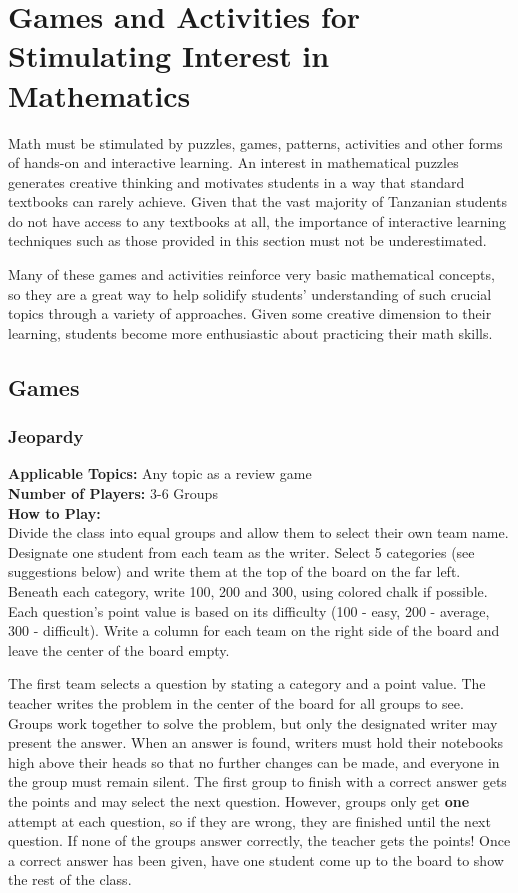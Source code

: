 \chapter{Games and Activities for Stimulating Interest in Mathematics} \label{cha:gamesandactivities}
Math must be stimulated by puzzles, games, patterns, activities and other forms of hands-on and interactive learning. An interest in mathematical puzzles generates creative thinking and motivates students in a way that standard textbooks can rarely achieve. Given that the vast majority of Tanzanian students do not have access to any textbooks at all, the importance of interactive learning techniques such as those provided in this section must not be underestimated.

Many of these games and activities reinforce very basic mathematical concepts, so they are a great way to help solidify students' understanding of such crucial topics through a variety of approaches. Given some creative dimension to their learning, students become more enthusiastic about practicing their math skills.

\section{Games} \label{games}

	\subsection{Jeopardy} \label{jeopardy}
	\textbf{Applicable Topics:} Any topic as a review game\\	
	\textbf{Number of Players:} 3-6 Groups\\
	
	\noindent \textbf{How to Play:}\\
	Divide the class into equal groups and allow them to select their own team name. Designate one student from each team as the writer. Select 5 categories (see suggestions below) and write them at the top of the board on the far left. Beneath each category, write 100, 200 and 300, using colored chalk if possible. Each question's point value is based on its difficulty (100 - easy, 200 - average, 300 - difficult). Write a column for each team on the right side of the board and leave the center of the board empty.
	
	The first team selects a question by stating a category and a point value. The teacher writes the problem in the center of the board for all groups to see. Groups work together to solve the problem, but only the designated writer may present the answer. When an answer is found, writers must hold their notebooks high above their heads so that no further changes can be made, and everyone in the group must remain silent. The first group to finish with a correct answer gets the points and may select the next question. However, groups only get \textbf{one} attempt at each question, so if they are wrong, they are finished until the next question. If none of the groups answer correctly, the teacher gets the points! Once a correct answer has been given, have one student come up to the board to show the rest of the class. 
	
